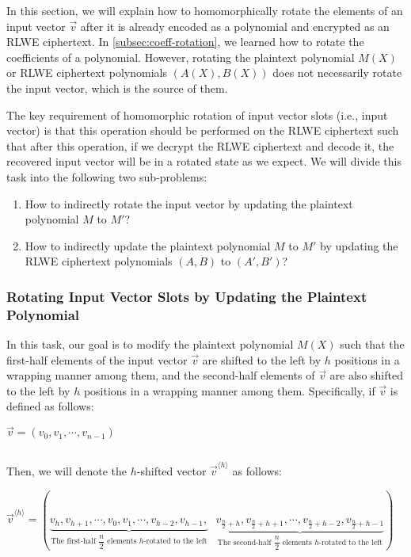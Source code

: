 In this section, we will explain how to homomorphically rotate the elements of an input vector $\vec{v}$ after it is already encoded as a polynomial and encrypted as an RLWE ciphertext. In \autoref{subsec:coeff-rotation}, we learned how to rotate the coefficients of a polynomial. However, rotating the plaintext polynomial $M(X)$ or RLWE ciphertext polynomials $(A(X), B(X))$ does not necessarily rotate the input vector, which is the source of them. 

The key requirement of homomorphic rotation of input vector slots (i.e., input vector) is that this operation should be performed on the RLWE ciphertext such that after this operation, if we decrypt the RLWE ciphertext and decode it, the recovered input vector will be in a rotated state as we expect. We will divide this task into the following two sub-problems:

\begin{enumerate}[leftmargin=3\parindent]
\item How to indirectly rotate the input vector by updating the plaintext polynomial $M$ to $M'$?

\item How to indirectly update the plaintext polynomial $M$ to $M'$ by updating the RLWE ciphertext polynomials $(A, B)$ to $(A', B')$?
\end{enumerate}



\subsubsection{Rotating Input Vector Slots by Updating the Plaintext Polynomial}

In this task, our goal is to modify the plaintext polynomial $M(X)$ such that the first-half elements of the input vector $\vec{v}$ are shifted to the left by $h$ positions in a wrapping manner among them, and the second-half elements of $\vec{v}$ are also shifted to the left by $h$ positions in a wrapping manner among them. Specifically, if $\vec{v}$ is defined as follows:

$\vec{v} = (v_0, v_1, \cdots, v_{n-1})$

$ $

Then, we will denote the $h$-shifted vector $\vec{v}^{\langle h \rangle}$ as follows:  

$\vec{v}^{\langle h \rangle} = (\underbrace{v_h, v_{h+1}, \cdots, v_0, v_1, \cdots, v_{h-2}, v_{h-1},}_{\text{The first-half $\dfrac{n}{2}$ elements $h$-rotated to the left}} \text{ } \underbrace{v_{\frac{n}{2}+h}, v_{\frac{n}{2}+h+1}, \cdots, v_{\frac{n}{2}+h-2}, v_{\frac{n}{2}+h-1}}_{\text{The second-half $\dfrac{n}{2}$ elements $h$-rotated to the left}})$

